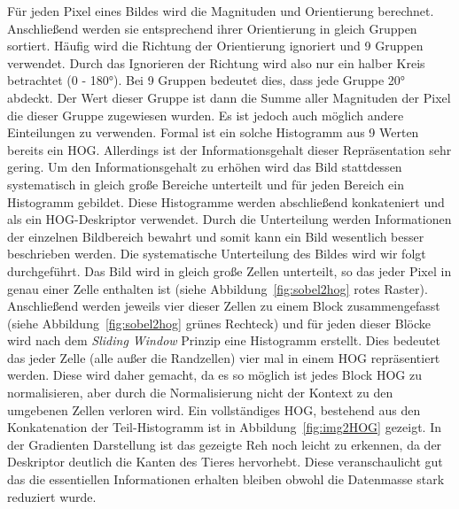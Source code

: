 Für jeden Pixel eines Bildes wird die Magnituden und Orientierung berechnet. Anschließend werden sie entsprechend ihrer Orientierung in gleich Gruppen sortiert. Häufig wird die Richtung der Orientierung ignoriert und 9 Gruppen verwendet. Durch das Ignorieren der Richtung wird also nur ein halber Kreis betrachtet (0 - 180°). Bei 9 Gruppen bedeutet dies, dass jede Gruppe 20° abdeckt. Der Wert dieser Gruppe ist dann die Summe aller Magnituden der Pixel die dieser Gruppe zugewiesen wurden. Es ist jedoch auch möglich andere Einteilungen zu verwenden. 
Formal ist ein solche Histogramm aus 9 Werten bereits ein HOG. Allerdings ist der Informationsgehalt dieser Repräsentation sehr gering. Um den Informationsgehalt zu erhöhen wird das Bild stattdessen systematisch in gleich große Bereiche unterteilt und für jeden Bereich ein Histogramm gebildet. Diese Histogramme werden abschließend konkateniert und als ein HOG-Deskriptor verwendet. Durch die Unterteilung werden Informationen der einzelnen Bildbereich bewahrt und somit kann ein Bild wesentlich besser beschrieben werden. Die systematische Unterteilung des Bildes wird wir folgt durchgeführt. Das Bild wird in gleich große Zellen unterteilt, so das jeder Pixel in genau einer Zelle enthalten ist (siehe Abbildung~\ref{fig:sobel2hog} rotes Raster). Anschließend werden jeweils vier dieser Zellen zu einem Block zusammengefasst (siehe Abbildung~\ref{fig:sobel2hog} grünes Rechteck) und für jeden dieser Blöcke wird nach dem \textit{Sliding Window} Prinzip eine Histogramm erstellt. Dies bedeutet das jeder Zelle (alle außer die Randzellen) vier mal in einem HOG repräsentiert werden. Diese wird daher gemacht, da es so möglich ist jedes Block HOG zu normalisieren, aber durch die Normalisierung nicht der Kontext zu den umgebenen Zellen verloren wird. 
Ein vollständiges HOG, bestehend aus den Konkatenation der Teil-Histogramm ist in Abbildung~\ref{fig:img2HOG} gezeigt. In der Gradienten Darstellung ist das gezeigte Reh noch leicht zu erkennen, da der Deskriptor deutlich die Kanten des Tieres hervorhebt. Diese veranschaulicht gut das die essentiellen Informationen erhalten bleiben obwohl die Datenmasse stark reduziert wurde. \cite{hog1}
